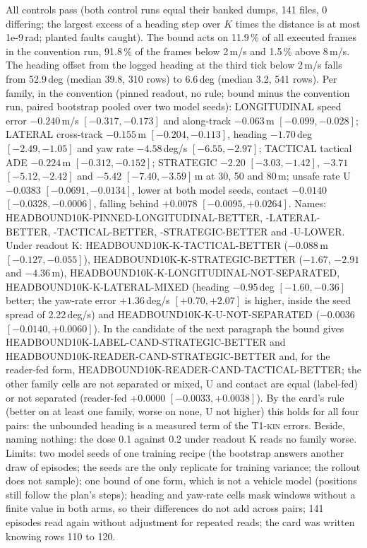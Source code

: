 \documentclass[10pt,twocolumn]{article}
\makeatletter
\theoremstyle{remark}
\newcommand{\tier}[1]{\textsc{\small #1}}
\renewcommand\paragraph{\@startsection{paragraph}{4}{\z@}{1.6ex \@plus .5ex \@minus .2ex}{-1em}{\normalfont\normalsize\bfseries}}
\makeatother
\begin{document}
\paragraph{What the bound does (row 122).} All controls pass (both control runs equal their banked dumps, 141 files, 0 differing; the largest excess of a heading step over $K$ times the distance is at most 1e-9\,rad; planted faults caught). The bound acts on 11.9\,\% of all executed frames in the convention run, 91.8\,\% of the frames below 2\,m/s and 1.5\,\% above 8\,m/s. The heading offset from the logged heading at the third tick below 2\,m/s falls from 52.9\,deg (median 39.8, 310 rows) to 6.6\,deg (median 3.2, 541 rows). Per family, in the convention (pinned readout, no rule; bound minus the convention run, paired bootstrap pooled over two model seeds): LONGITUDINAL speed error $-0.240$\,m/s $[-0.317,-0.173]$ and along-track $-0.063$\,m $[-0.099,-0.028]$; LATERAL cross-track $-0.155$\,m $[-0.204,-0.113]$, heading $-1.70$\,deg $[-2.49,-1.05]$ and yaw rate $-4.58$\,deg/s $[-6.55,-2.97]$; TACTICAL tactical ADE $-0.224$\,m $[-0.312,-0.152]$; STRATEGIC $-2.20$ $[-3.03,-1.42]$, $-3.71$ $[-5.12,-2.42]$ and $-5.42$ $[-7.40,-3.59]$\,m at 30, 50 and 80\,m; unsafe rate U $-0.0383$ $[-0.0691,-0.0134]$, lower at both model seeds, contact $-0.0140$ $[-0.0328,-0.0006]$, falling behind $+0.0078$ $[-0.0095,+0.0264]$. Names: HEADBOUND10K-PINNED-LONGITUDINAL-BETTER, -LATERAL-BETTER, -TACTICAL-BETTER, -STRATEGIC-BETTER and -U-LOWER. Under readout K: HEADBOUND10K-K-TACTICAL-BETTER ($-0.088$\,m $[-0.127,-0.055]$), HEADBOUND10K-K-STRATEGIC-BETTER ($-1.67$, $-2.91$ and $-4.36$\,m), HEADBOUND10K-K-LONGITUDINAL-NOT-SEPARATED, HEADBOUND10K-K-LATERAL-MIXED (heading $-0.95$\,deg $[-1.60,-0.36]$ better; the yaw-rate error $+1.36$\,deg/s $[+0.70,+2.07]$ is higher, inside the seed spread of 2.22\,deg/s) and HEADBOUND10K-K-U-NOT-SEPARATED ($-0.0036$ $[-0.0140,+0.0060]$). In the candidate of the next paragraph the bound gives HEADBOUND10K-LABEL-CAND-STRATEGIC-BETTER and HEADBOUND10K-READER-CAND-STRATEGIC-BETTER and, for the reader-fed form, HEADBOUND10K-READER-CAND-TACTICAL-BETTER; the other family cells are not separated or mixed, U and contact are equal (label-fed) or not separated (reader-fed $+0.0000$ $[-0.0033,+0.0038]$). By the card's rule (better on at least one family, worse on none, U not higher) this holds for all four pairs: the unbounded heading is a measured term of the \tier{T1-kin} errors. Beside, naming nothing: the dose 0.1 against 0.2 under readout K reads no family worse. Limits: two model seeds of one training recipe (the bootstrap answers another draw of episodes; the seeds are the only replicate for training variance; the rollout does not sample); one bound of one form, which is not a vehicle model (positions still follow the plan's steps); heading and yaw-rate cells mask windows without a finite value in both arms, so their differences do not add across pairs; 141 episodes read again without adjustment for repeated reads; the card was written knowing rows 110 to 120.
\end{document}
